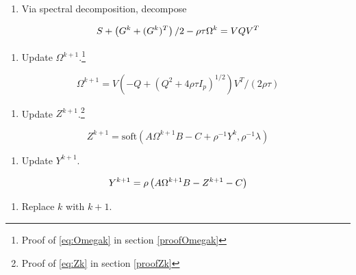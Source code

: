 \documentclass[11pt,]{report}
\providecommand{\tightlist}{%
  \setlength{\itemsep}{0pt}\setlength{\parskip}{0pt}}
\begin{document}
\begin{enumerate}
\def\labelenumi{\arabic{enumi}.}
\setcounter{enumi}{1}
\tightlist
\item
  Via spectral decomposition, decompose
\end{enumerate}

\begin{equation}
S + \left( G^{k} + (G^{k})^{T} \right)/2 - \rho\tau\Omega^{k} = VQV^{T}
\label{eq:VQV}\notag
\end{equation}

\begin{enumerate}
\def\labelenumi{\arabic{enumi}.}
\setcounter{enumi}{2}
\tightlist
\item
  Update \(\Omega^{k + 1}\).\footnote{Proof of \eqref{eq:Omegak} in section \ref{proofOmegak}}
\end{enumerate}

\begin{equation}
\Omega^{k + 1} = V\left( -Q + (Q^{2} + 4\rho\tau I_{p})^{1/2} \right)V^{T}/(2\rho\tau)
\label{eq:Omegak}
\end{equation}

\begin{enumerate}
\def\labelenumi{\arabic{enumi}.}
\setcounter{enumi}{3}
\tightlist
\item
  Update \(Z^{k + 1}\).\footnote{Proof of \eqref{eq:Zk} in section \ref{proofZk}}
\end{enumerate}

\begin{equation}
Z^{k + 1} = \mbox{soft}\left( A\Omega^{k + 1}B - C + \rho^{-1}Y^{k}, \rho^{-1}\lambda \right)
\label{eq:Zk}
\end{equation}

\begin{enumerate}
\def\labelenumi{\arabic{enumi}.}
\setcounter{enumi}{4}
\tightlist
\item
  Update \(Y^{k + 1}\).
\end{enumerate}

\begin{equation}
Y^{k + 1} = \rho\left( A\Omega^{k + 1} B - Z^{k + 1} - C \right)
\label{eq:Yk}\notag
\end{equation}

\begin{enumerate}
\def\labelenumi{\arabic{enumi}.}
\setcounter{enumi}{5}
\tightlist
\item
  Replace \(k\) with \(k + 1\).
\end{enumerate}
\end{document}
